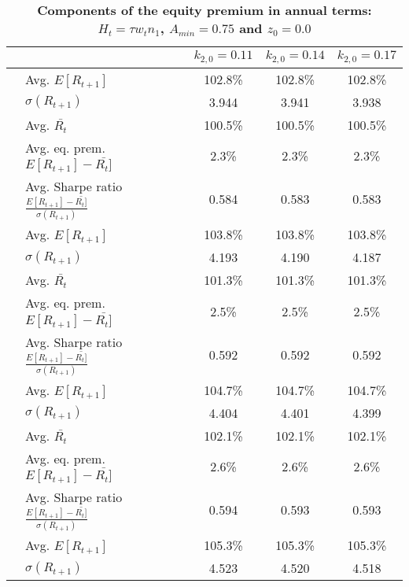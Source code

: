 \documentclass[letterpaper,12pt]{article}
\theoremstyle{definition}
\begin{document}
\begin{spacing}{1.5}
  \begin{table}[htbp]\centering\captionsetup{width=6.0in}
    \caption{\label{TabEqPrem_tA75}\textbf{Components of the equity premium in annual terms: $H_t = \tau w_t n_1$, $A_{min}=0.75$ and $z_0=0.0$}}
    \begin{threeparttable}
    \begin{tabular}{>{\small}l| >{\small}l| >{\small}c| >{\small}c| >{\small}c}
      \hline\hline
      & & $k_{2,0}=0.11$ & $k_{2,0}=0.14$ & $k_{2,0}=0.17$ \\
      \hline
      \multirow{5}{*}{$\tau=0.00$} & \quad Avg. $E[R_{t+1}]$ & 102.8\% & 102.8\% & 102.8\% \\
      & \quad $\sigma(R_{t+1})$ & 3.944 & 3.941 & 3.938 \\
      & \quad Avg. $\bar{R_t}$ & 100.5\% & 100.5\% & 100.5\% \\
      & \quad Avg. eq. prem. $E[R_{t+1}] - \bar{R_t]}$ & 2.3\% & 2.3\% & 2.3\% \\
      & \quad Avg. Sharpe ratio $\frac{E[R_{t+1}] - \bar{R_t]}}{\sigma(R_{t+1})}$ & 0.584 & 0.583 & 0.583 \\
      \hline
      \multirow{5}{*}{$\tau=0.11$} & \quad Avg. $E[R_{t+1}]$ & 103.8\% & 103.8\% & 103.8\% \\
      & \quad $\sigma(R_{t+1})$ & 4.193 & 4.190 & 4.187 \\
      & \quad Avg. $\bar{R_t}$ & 101.3\% & 101.3\% & 101.3\% \\
      & \quad Avg. eq. prem. $E[R_{t+1}] - \bar{R_t]}$ & 2.5\% & 2.5\% & 2.5\% \\
      & \quad Avg. Sharpe ratio $\frac{E[R_{t+1}] - \bar{R_t]}}{\sigma(R_{t+1})}$ & 0.592 & 0.592 & 0.592 \\
      \hline
      \multirow{5}{*}{$\tau=0.20$} & \quad Avg. $E[R_{t+1}]$ & 104.7\% & 104.7\% & 104.7\% \\
      & \quad $\sigma(R_{t+1})$ & 4.404 & 4.401 & 4.399 \\
      & \quad Avg. $\bar{R_t}$ & 102.1\% & 102.1\% & 102.1\% \\
      & \quad Avg. eq. prem. $E[R_{t+1}] - \bar{R_t]}$ & 2.6\% & 2.6\% & 2.6\% \\
      & \quad Avg. Sharpe ratio $\frac{E[R_{t+1}] - \bar{R_t]}}{\sigma(R_{t+1})}$ & 0.594 & 0.593 & 0.593 \\
      \hline
      \multirow{5}{*}{$\tau=0.25$} & \quad Avg. $E[R_{t+1}]$ & 105.3\% & 105.3\% & 105.3\% \\
      & \quad $\sigma(R_{t+1})$ & 4.523 & 4.520 & 4.518 \\

\end{tabular}
\end{threeparttable}
\end{table}
\end{spacing}
\end{document}
